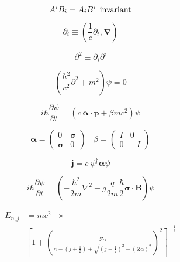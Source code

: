 \documentclass[11pt]{article}
\newcommand{\vect}[1]{\boldsymbol{\mathbf{#1}}}
\begin{document}
\begin{multicols}{2}
\begin{equation}
A^i B_i = A_i B^i \:\: {\rm invariant}
\end{equation}

\begin{equation}
\partial_i \equiv (\frac{1}{c}\partial_t, \vect{\nabla})
\end{equation}

\begin{equation}
\partial^2 \equiv \partial_{i} \partial^{i}
\end{equation}

\begin{equation}
\left( \frac{\hbar^2}{c^2} \partial^2 + m^2 \right) \psi = 0
\end{equation}

\begin{equation}
i \hbar \frac{\partial \psi}{\partial t} =
 \left( c \: \vect{\alpha} \cdot \vect{p} + \beta mc^2 \right) \psi
\end{equation}

\begin{equation}
\vect{\alpha} = \left(
                   \begin{array}{cc}
                     0 & \vect{\sigma} \\
                     \vect{\sigma} & 0
                   \end{array}
                \right)
\:\:\:\:
\beta = \left(
           \begin{array}{cc}
              I & 0 \\
              0 & -I
           \end{array}
        \right)
\end{equation}

\begin{equation}
\vect{j} = c \: \psi^{\dagger} \vect{\alpha} \psi
\end{equation}

\begin{equation}
i \hbar \frac{\partial \psi}{\partial t} =
\left (-\frac{\hbar^2}{2m} \nabla^2
  - g \frac{q}{2m} \frac{\hbar}{2} \vect{\sigma}\cdot \vect{B} \right)
  \psi
\end{equation}

\begin{align}
  E_{n,j} & = mc^2 \:\:\: \times \nonumber \\
    & \left[1 +
    \left(
    \frac{Z\alpha}{
      n - (j+\frac{1}{2}) + \sqrt{(j+\frac{1}{2})^2 - (Z\alpha)^2}
      }
    \right)^2
    \right]^{-\frac{1}{2}}
\end{align}


\end{multicols}
\end{document}
